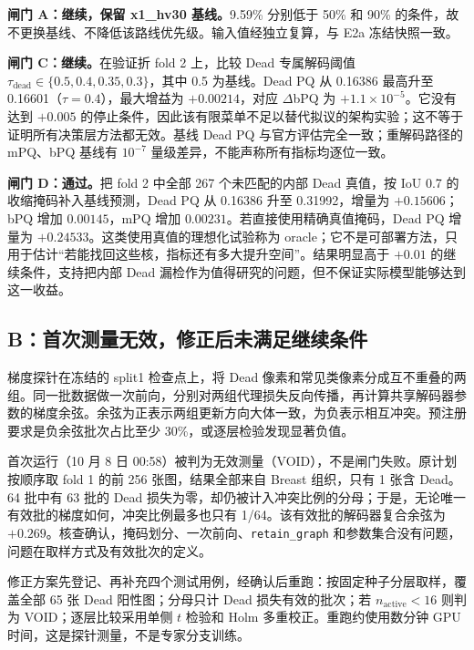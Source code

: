 \documentclass[11pt,a4paper,UTF8,fontset=fandol]{ctexart}
\newcommand{\code}[1]{\nolinkurl{#1}}
\begin{document}
\textbf{闸门 A：继续，保留 x1\_hv30 基线。}9.59\% 分别低于 50\% 和 90\% 的条件，故不更换基线、不降低该路线优先级。输入值经独立复算，与 E2a 冻结快照一致。

\textbf{闸门 C：继续。}在验证折 fold 2 上，比较 Dead 专属解码阈值 $\tau_{\mathrm{dead}}\in\{0.5,0.4,0.35,0.3\}$，其中 0.5 为基线。Dead PQ 从 0.16386 最高升至 0.16601（$\tau=0.4$），最大增益为 $+0.00214$，对应 $\Delta$bPQ 为 $+1.1\times10^{-5}$。它没有达到 $+0.005$ 的停止条件，因此该有限菜单不足以替代拟议的架构实验；这不等于证明所有决策层方法都无效。基线 Dead PQ 与官方评估完全一致；重解码路径的 mPQ、bPQ 基线有 $10^{-7}$ 量级差异，不能声称所有指标均逐位一致。

\textbf{闸门 D：通过。}把 fold 2 中全部 267 个未匹配的内部 Dead 真值，按 IoU 0.7 的收缩掩码补入基线预测，Dead PQ 从 0.16386 升至 0.31992，增量为 $+0.15606$；bPQ 增加 $0.00145$，mPQ 增加 $0.00231$。若直接使用精确真值掩码，Dead PQ 增量为 $+0.24533$。这类使用真值的理想化试验称为 oracle；它不是可部署方法，只用于估计“若能找回这些核，指标还有多大提升空间”。结果明显高于 $+0.01$ 的继续条件，支持把内部 Dead 漏检作为值得研究的问题，但不保证实际模型能够达到这一收益。

\subsection{B：首次测量无效，修正后未满足继续条件}

梯度探针在冻结的 split1 检查点上，将 Dead 像素和常见类像素分成互不重叠的两组。同一批数据做一次前向，分别对两组代理损失反向传播，再计算共享解码器参数的梯度余弦。余弦为正表示两组更新方向大体一致，为负表示相互冲突。预注册要求是负余弦批次占比至少 30\%，或逐层检验发现显著负值。

首次运行（10 月 8 日 00:58）被判为无效测量（VOID），不是闸门失败。原计划按顺序取 fold 1 的前 256 张图，结果全部来自 Breast 组织，只有 1 张含 Dead。64 批中有 63 批的 Dead 损失为零，却仍被计入冲突比例的分母；于是，无论唯一有效批的梯度如何，冲突比例最多也只有 1/64。该有效批的解码器复合余弦为 $+0.269$。核查确认，掩码划分、一次前向、\code{retain\_graph} 和参数集合没有问题，问题在取样方式及有效批次的定义。

修正方案先登记、再补充四个测试用例，经确认后重跑：按固定种子分层取样，覆盖全部 65 张 Dead 阳性图；分母只计 Dead 损失有效的批次；若 $n_{\mathrm{active}}<16$ 则判为 VOID；逐层比较采用单侧 $t$ 检验和 Holm 多重校正。重跑约使用数分钟 GPU 时间，这是探针测量，不是专家分支训练。
\end{document}
